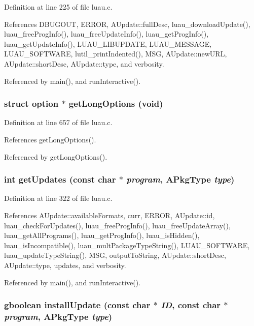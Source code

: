 Definition at line 225 of file luau.c.

References DBUGOUT, ERROR, AUpdate::full\-Desc, luau\_\-download\-Update(), luau\_\-free\-Prog\-Info(), luau\_\-free\-Update\-Info(), luau\_\-get\-Prog\-Info(), luau\_\-get\-Update\-Info(), LUAU\_\-LIBUPDATE, LUAU\_\-MESSAGE, LUAU\_\-SOFTWARE, lutil\_\-print\-Indented(), MSG, AUpdate::new\-URL, AUpdate::short\-Desc, AUpdate::type, and verbosity.

Referenced by main(), and run\-Interactive().
\subsubsection{\setlength{\rightskip}{0pt plus 5cm}struct option $\ast$ get\-Long\-Options (void)\hspace{0.3cm}{\tt  [static]}}\label{luau_8c_a5}




Definition at line 657 of file luau.c.

References get\-Long\-Options().

Referenced by get\-Long\-Options().
\subsubsection{\setlength{\rightskip}{0pt plus 5cm}int get\-Updates (const char $\ast$ {\em program}, {\bf APkg\-Type} {\em type})\hspace{0.3cm}{\tt  [static]}}\label{luau_8c_a8}




Definition at line 322 of file luau.c.

References AUpdate::available\-Formats, curr, ERROR, AUpdate::id, luau\_\-check\-For\-Updates(), luau\_\-free\-Prog\-Info(), luau\_\-free\-Update\-Array(), luau\_\-get\-All\-Programs(), luau\_\-get\-Prog\-Info(), luau\_\-is\-Hidden(), luau\_\-is\-Incompatible(), luau\_\-mult\-Package\-Type\-String(), LUAU\_\-SOFTWARE, luau\_\-update\-Type\-String(), MSG, output\-To\-String, AUpdate::short\-Desc, AUpdate::type, updates, and verbosity.

Referenced by main(), and run\-Interactive().
\subsubsection{\setlength{\rightskip}{0pt plus 5cm}gboolean install\-Update (const char $\ast$ {\em ID}, const char $\ast$ {\em program}, {\bf APkg\-Type} {\em type})\hspace{0.3cm}{\tt  [static]}}\label{luau_8c_a7}




